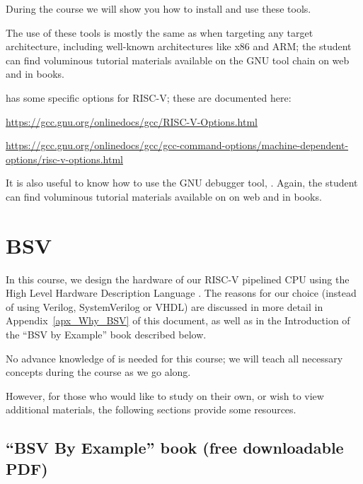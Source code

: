 During the course we will show you how to install and use these tools.

The use of these tools is mostly the same as when targeting any target
architecture, including well-known architectures like x86 and ARM; the
student can find voluminous tutorial materials available on the GNU
tool chain on web and in books.

{\gcc} has some specific options for RISC-V; these are documented here:

\begin{tightlist}
  \item
  \url{https://gcc.gnu.org/onlinedocs/gcc/RISC-V-Options.html}

  \item
  \url{https://gcc.gnu.org/onlinedocs/gcc/gcc-command-options/machine-dependent-options/risc-v-options.html}
\end{tightlist}

It is also useful to know how to use the GNU debugger tool, {\gdb}.
Again, the student can find voluminous tutorial materials available on
on web and in books.


\section{BSV}

In this course, we design the hardware of our RISC-V pipelined CPU
using the High Level Hardware Description Language {\BSV}.  The
reasons for our choice (instead of using Verilog, SystemVerilog or
VHDL) are discussed in more detail in Appendix~\ref{apx_Why_BSV} of
this document, as well as in the Introduction of the ``BSV by
Example'' book described below.

No advance knowledge of {\BSV} is needed for this course; we will
teach all necessary {\BSV} concepts during the course as we go along.

However, for those who would like to study {\BSV} on their own, or
wish to view additional {\BSV} materials, the following sections
provide some resources.


\subsection{``BSV By Example'' book (free downloadable PDF)}

